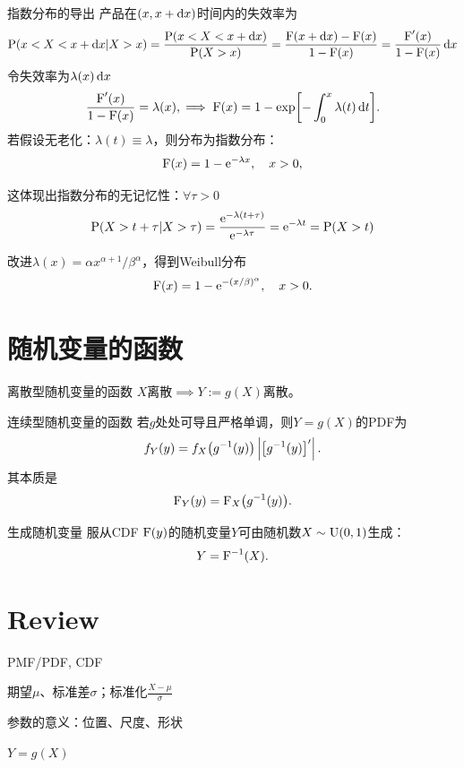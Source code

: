 \begin{example}{指数分布的导出}{}
	产品在$(x,x+\mathop{}\!\mathrm{d} x)$时间内的失效率为
	\[
		\operatorname{P}(x<X<x+\mathop{}\!\mathrm{d} x|X>x)=\frac{\operatorname{P}(x<X<x+\mathop{}\!\mathrm{d} x)}{\operatorname{P}(X>x)}=\frac{\operatorname{F}(x+\mathop{}\!\mathrm{d} x)-\operatorname{F}(x)}{1-\operatorname{F}(x)}=\frac{\operatorname{F}'(x)}{1-\operatorname{F}(x)}\mathop{}\!\mathrm{d} x
	\]
	令失效率为$\lambda(x)\mathop{}\!\mathrm{d} x$
	\[
		\frac{\operatorname{F}'(x)}{1-\operatorname{F}(x)}=\lambda(x),\implies\operatorname{F}(x)=1-\exp\biggl[-\int_0^x\lambda(t)\mathop{}\!\mathrm{d} t\biggr].
	\]
	若假设无老化：$\lambda(t)\equiv\lambda$，则分布为指数分布：
	\begin{equation}
		\operatorname{F}(x)=1-\mathop{}\!\mathrm{e}^{-\lambda x},\quad x>0,
	\end{equation}

	这体现出指数分布的无记忆性：$\forall\tau>0$
	\[
		\operatorname{P}(X>t+\tau|X>\tau)=\frac{\mathop{}\!\mathrm{e}^{-\lambda(t+\tau)}}{\mathop{}\!\mathrm{e}^{-\lambda\tau}}=\mathop{}\!\mathrm{e}^{-\lambda t}=\operatorname{P}(X>t)
	\]

	\tcblower
	
	改进$\lambda(x)=\alpha x^{\alpha+1}/\beta^\alpha$，得到Weibull分布
	\begin{equation}
		\label{eq:Weibull CDF}
		\operatorname{F}(x)=1-\mathop{}\!\mathrm{e}^{-(x/\beta)^\alpha},\quad x>0.
	\end{equation}
\end{example}

\section{随机变量的函数}

\begin{theorem}
	{离散型随机变量的函数}{}
	$X$离散$\implies Y:=g(X)$离散。
\end{theorem}

\begin{theorem}{连续型随机变量的函数}{}
	若$g$处处可导且严格单调，则$Y=g(X)$的PDF为
	\begin{equation}
		f_Y(y)=f_X\bigl(g^{-1}(y)\bigr)\left\lvert\left[g^{-1}(y)\right]'\right\rvert.
	\end{equation}
	其本质是
	\begin{equation}
		\operatorname{F}_Y(y)=\operatorname{F}_X\bigl(g^{-1}(y)\bigr).
	\end{equation}
\end{theorem}
\begin{example}{生成随机变量}{}
	服从CDF $\operatorname{F}(y)$的随机变量$Y$可由随机数$X\sim\operatorname{U}(0,1)$生成：
	\begin{equation}
		Y=\operatorname{F}^{-1}(X).
	\end{equation}
\end{example}
\section*{Review}
\begin{compactenum}
	\item PMF/PDF, CDF
	\item 期望$\mu$、标准差$\sigma$；标准化$\frac{X-\mu}\sigma$
	\item 参数的意义：位置、尺度、形状
	\item $Y=g(X)$
\end{compactenum}